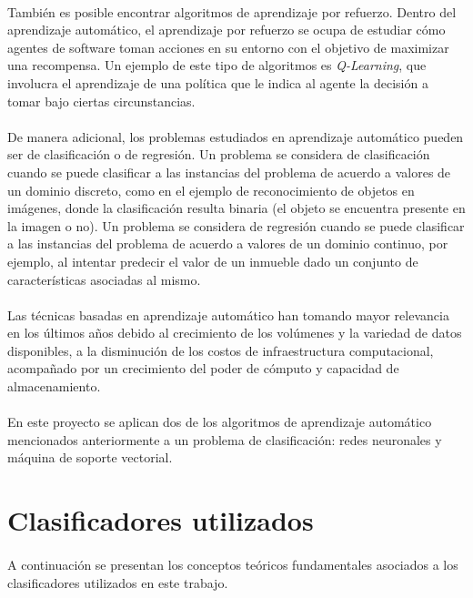 \paragraph{}También es posible encontrar algoritmos de aprendizaje por refuerzo.
Dentro del aprendizaje automático, el aprendizaje por refuerzo se ocupa de estudiar cómo agentes de software toman acciones en su entorno con el objetivo de maximizar una recompensa.
Un ejemplo de este tipo de algoritmos es \textit{Q-Learning}, que involucra el aprendizaje de una política que le indica al agente la decisión a tomar bajo ciertas circunstancias.

\paragraph{}De manera adicional, los problemas estudiados en aprendizaje automático pueden ser de clasificación o de regresión.
Un problema se considera de clasificación cuando se puede clasificar a las instancias del problema de acuerdo a valores de un dominio discreto, como en el ejemplo de reconocimiento de objetos en imágenes, donde la clasificación resulta binaria (el objeto se encuentra presente en la imagen o no).
Un problema se considera de regresión cuando se puede clasificar a las instancias del problema de acuerdo a valores de un dominio continuo, por ejemplo, al intentar predecir el valor de un inmueble dado un conjunto de características asociadas al mismo.

\paragraph{}Las técnicas basadas en aprendizaje automático han tomando mayor relevancia en los últimos años debido al crecimiento de los volúmenes y la variedad de datos disponibles, a la disminución de los costos de infraestructura computacional, acompañado por un crecimiento del poder de cómputo y capacidad de almacenamiento.

\paragraph{}En este proyecto se aplican dos de los algoritmos de aprendizaje automático mencionados anteriormente a un problema de clasificación: redes neuronales y máquina de soporte vectorial.

\section{Clasificadores utilizados}

\paragraph{}A continuación se presentan los conceptos teóricos fundamentales asociados a los clasificadores utilizados en este trabajo.





